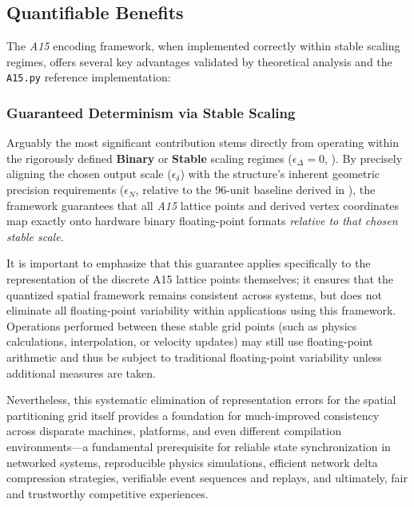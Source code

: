 \documentclass[10pt]{article}
\def\AAAB{\textit{A15}}
\begin{document}
\subsection{Quantifiable Benefits}\label{subsec-discussion-benefits}

The \AAAB{} encoding framework, when implemented correctly within stable scaling regimes, offers several key advantages validated by theoretical analysis and the \texttt{A15.py} \cite{Risinger2024A15} reference implementation:

\subsubsection{Guaranteed Determinism via Stable Scaling}\label{subsubsec-benefits-determinism}
Arguably the most significant contribution stems directly from operating within the rigorously defined \textbf{Binary} or \textbf{Stable} scaling regimes ($\epsilon_\Delta = 0$, ). By precisely aligning the chosen output scale ($\epsilon_\delta$) with the structure's inherent geometric precision requirements ($\epsilon_N$, relative to the 96-unit baseline derived in ), the framework guarantees that all \AAAB{} lattice points and derived vertex coordinates map exactly onto hardware binary floating-point formats \emph{relative to that chosen stable scale}.

It is important to emphasize that this guarantee applies specifically to the representation of the discrete A15 lattice points themselves; it ensures that the quantized spatial framework remains consistent across systems, but does not eliminate all floating-point variability within applications using this framework. Operations performed between these stable grid points (such as physics calculations, interpolation, or velocity updates) may still use floating-point arithmetic and thus be subject to traditional floating-point variability unless additional measures are taken.

Nevertheless, this systematic elimination of representation errors for the spatial partitioning grid itself provides a foundation for much-improved consistency across disparate machines, platforms, and even different compilation environments—a fundamental prerequisite for reliable state synchronization in networked systems, reproducible physics simulations, efficient network delta compression strategies, verifiable event sequences and replays, and ultimately, fair and trustworthy competitive experiences.
\end{document}
